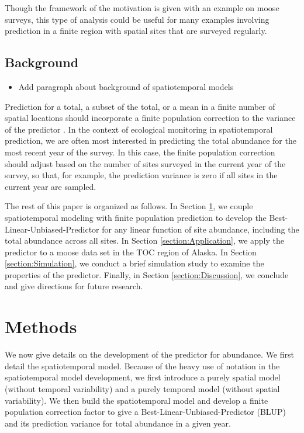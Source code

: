 \documentclass[]{interact}
\theoremstyle{plain}%
\theoremstyle{definition}
\theoremstyle{remark}
\def\tightlist{}
\begin{document}
Though the framework of the motivation is given with an example on moose
surveys, this type of analysis could be useful for many examples
involving prediction in a finite region with spatial sites that are
surveyed regularly.

\subsection{Background}

\begin{itemize}
\tightlist
\item
  Add paragraph about background of spatiotemporal models
\end{itemize}

Prediction for a total, a subset of the total, or a mean in a finite
number of spatial locations should incorporate a finite population
correction to the variance of the predictor
\citep{ver2008spatial, higham2021adjusting}. In the context of
ecological monitoring in spatiotemporal prediction, we are often most
interested in predicting the total abundance for the most recent year of
the survey. In this case, the finite population correction should adjust
based on the number of sites surveyed in the current year of the survey,
so that, for example, the prediction variance is zero if all sites in
the current year are sampled.

The rest of this paper is organized as follows. In Section
\ref{section:Methods}, we couple spatiotemporal modeling with finite
population prediction to develop the Best-Linear-Unbiased-Predictor for
any linear function of site abundance, including the total abundance
across all sites. In Section \ref{section:Application}, we apply the
predictor to a moose data set in the TOC region of Alaska. In Section
\ref{section:Simulation}, we conduct a brief simulation study to examine
the properties of the predictor. Finally, in Section
\ref{section:Discussion}, we conclude and give directions for future
research.

\section{Methods} \label{section:Methods}

We now give details on the development of the predictor for abundance.
We first detail the spatiotemporal model. Because of the heavy use of
notation in the spatiotemporal model development, we first introduce a
purely spatial model (without temporal variability) and a purely
temporal model (without spatial variability). We then build the
spatiotemporal model and develop a finite population correction factor
to give a Best-Linear-Unbiased-Predictor (BLUP) and its prediction
variance for total abundance in a given year.
\end{document}
